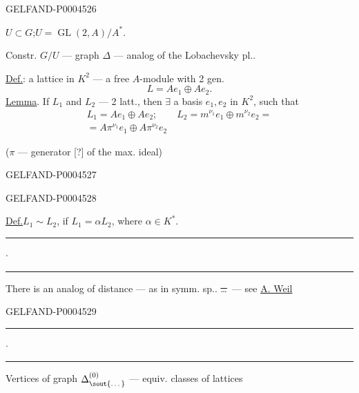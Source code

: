 \begin{GelfandAdjacentEvidence}{GELFAND-P000452}{6}


$U\subset G$;\quad $U=\operatorname{GL}(2,A)/A^*$.

Constr. $G/U$ — graph $\Delta$ — analog of the Lobachevsky pl..

\underline{Def.}: a lattice in $K^2$ — a free $A$-module with 2 gen.
\[
L=Ae_1\oplus Ae_2.
\]
\underline{Lemma}. If $L_1$ and $L_2$ — 2 latt.,
then $\exists$ a basis $e_1,e_2$ in $K^2$, such that
\[
\begin{gathered}
L_1=Ae_1\oplus Ae_2;\qquad L_2=m^{\nu_1}e_1\oplus m^{\nu_2}e_2=\\
{}=A\pi^{\nu_1}e_1\oplus A\pi^{\nu_2}e_2
\end{gathered}
\]

\hfill($\pi$ — generator [?] of the max. ideal)
\end{GelfandAdjacentEvidence}
\begin{GelfandAdjacentEvidence}{GELFAND-P000452}{7}


\end{GelfandAdjacentEvidence}
\begin{GelfandAdjacentEvidence}{GELFAND-P000452}{8}


\underline{Def.}\quad $L_1\sim L_2$, if
\underline{$L_1=\alpha L_2$}, where $\alpha\in K^*$.

\begin{center}
\rule[.5ex]{17mm}{.35pt}\enspace$\cdot$\enspace\rule[.5ex]{19mm}{.35pt}
\end{center}
There is an analog of distance — as in symm. sp.. \sout{\ldots}\ — see \underline{A. Weil}
\end{GelfandAdjacentEvidence}
\begin{GelfandAdjacentEvidence}{GELFAND-P000452}{9}


\begin{center}
\rule[.5ex]{17mm}{.35pt}\enspace$\cdot$\enspace\rule[.5ex]{19mm}{.35pt}
\end{center}
Vertices of graph $\Delta^{(0)}_{\text{\sout{\ldots}}}$ — equiv. classes of lattices
\end{GelfandAdjacentEvidence}


